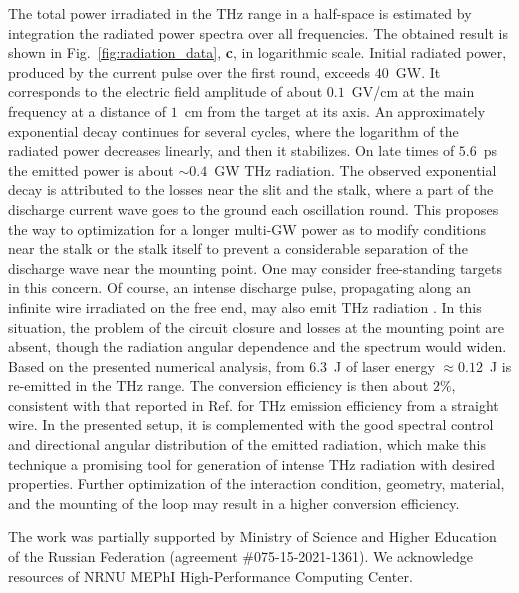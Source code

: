 \documentclass[aps,prl,twocolumn,superscriptaddress]{revtex4-1}
\begin{document}
The total power irradiated in the THz range in a half-space is estimated by integration the radiated power spectra over all frequencies. The obtained result is shown in Fig.~\ref{fig:radiation_data}, \textbf{c}, in logarithmic scale. Initial radiated power, produced by the current pulse over the first round, exceeds {$40$~GW}. It corresponds to the electric field amplitude of about {$0.1$~GV/cm} at the main frequency at a distance of $1$~cm from the target at its axis. An approximately exponential decay continues for several cycles, where the logarithm of the radiated power decreases linearly, and then it stabilizes. On late times of $5.6$~ps the emitted power is about {$\sim 0.4$~GW} THz radiation. The observed exponential decay is attributed to the losses near the slit and the stalk, where a part of the discharge current wave goes to the ground each oscillation round. This proposes the way to optimization for a longer multi-GW power as to modify conditions near the stalk or the stalk itself to prevent a considerable separation of the discharge wave near the mounting point. One may consider free-standing targets in this concern. 
Of course, an intense discharge pulse, propagating along an infinite wire irradiated on the free end, may also emit THz radiation \cite{Nakajima2017,Tian2017, Zhuo2017, Zeng2020}. In this situation, the problem of the circuit closure and losses at the mounting point are absent, though the radiation angular dependence and the spectrum would widen. 
Based on the presented numerical analysis, from $6.3$~J of laser energy {$\approx 0.12$~J} is re-emitted in the THz range. The conversion efficiency is then about {$2 \%$}, consistent with that reported in Ref.\cite{Zeng2020,Nakajima2017,Tian2017} for THz emission efficiency from a straight wire. In the presented setup, it is complemented with the good spectral control and directional angular distribution of the emitted radiation, which make this technique a promising tool for generation of intense THz radiation with desired properties. Further optimization of the interaction condition, geometry, material, and the mounting of the loop may result in a higher conversion efficiency. 

\begin{acknowledgments}
The work was partially supported by Ministry of Science and Higher Education of the Russian Federation (agreement \#075-15-2021-1361). We acknowledge resources of NRNU MEPhI High-Performance Computing Center. \end{acknowledgments}
\end{document}
